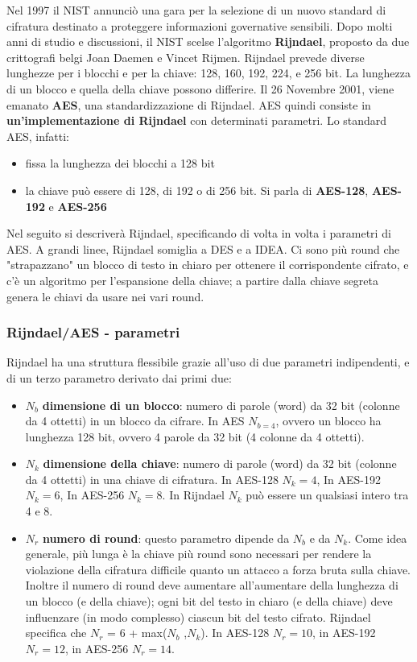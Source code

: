 Nel 1997 il NIST annunciò una gara per la selezione di un nuovo standard di cifratura destinato a proteggere informazioni governative sensibili. Dopo molti anni di studio e discussioni, il NIST scelse l'algoritmo \textbf{Rijndael}, proposto da due crittografi belgi Joan Daemen e Vincet Rijmen. Rijndael prevede diverse lunghezze per i blocchi e
per la chiave: 128, 160, 192, 224, e 256 bit. La lunghezza di un blocco e quella della chiave possono differire. Il 26 Novembre 2001, viene emanato \textbf{AES}, una standardizzazione di Rijndael. AES quindi consiste in \textbf{un'implementazione di Rijndael} con determinati parametri. Lo standard AES, infatti:
\begin{itemize}
  \item fissa la lunghezza dei blocchi a 128 bit
  \item la chiave può essere di 128, di 192 o di 256 bit. Si parla di \textbf{AES-128}, \textbf{AES-192} e \textbf{AES-256}
\end{itemize}

Nel seguito si descriverà Rijndael, specificando di volta in volta i parametri di AES. A grandi linee, Rijndael somiglia a DES e a IDEA. Ci sono più round che "strapazzano" un blocco di testo in chiaro per ottenere il corrispondente cifrato, e c'è un algoritmo per l'espansione della chiave; a partire dalla chiave segreta genera le chiavi da usare nei vari round.

\subsubsection{Rijndael/AES - parametri}
Rijndael ha una struttura flessibile grazie all'uso di due parametri indipendenti, e di un terzo parametro derivato dai primi due:
\begin{itemize}
  \item $N_{b}$ \textbf{dimensione di un blocco}: numero di parole (word) da 32 bit (colonne da 4 ottetti) in un blocco da cifrare. In AES $N_{b = 4}$, ovvero un blocco ha lunghezza 128 bit, ovvero 4 parole da 32 bit (4 colonne da 4 ottetti).
  \item $N_{k}$ \textbf{dimensione della chiave}: numero di parole (word) da 32 bit (colonne da 4 ottetti) in una chiave di cifratura. In AES-128 $N_{k} = 4$, In AES-192 $N_{k} = 6$, In AES-256 $N_{k} = 8$. In Rijndael $N_{k}$ può essere un qualsiasi intero tra 4 e 8.
  \item $N_{r}$ \textbf{numero di round}: questo parametro dipende da $N_{b}$ e da $N_{k}$. Come idea generale, più lunga è la chiave più round sono necessari per rendere la violazione della cifratura difficile quanto un attacco a forza bruta sulla chiave. Inoltre il numero di round deve aumentare all'aumentare della lunghezza di un blocco (e della chiave); ogni bit del testo in chiaro (e della chiave) deve influenzare (in modo complesso) ciascun bit del testo cifrato. Rijndael specifica che $N_{r}$ = 6 + max($N_{b}$ ,$N_{k}$). In AES-128 $N_{r} = 10$, in AES-192 $N_{r} = 12$, in AES-256 $N_{r} = 14$.
\end{itemize}
  
